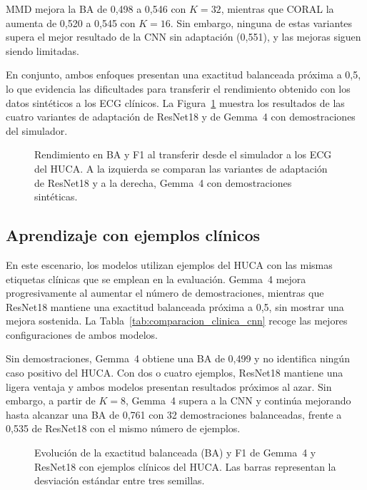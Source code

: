 MMD mejora la BA de 0,498 a 0,546 con \(K=32\), mientras que CORAL la aumenta de 0,520 a 0,545 con \(K=16\). Sin embargo, ninguna de estas variantes supera el mejor resultado de la CNN sin adaptación (0,551), y las mejoras siguen siendo limitadas.

En conjunto, ambos enfoques presentan una exactitud balanceada próxima a 0,5, lo que evidencia las dificultades para transferir el rendimiento obtenido con los datos sintéticos a los ECG clínicos. La Figura~\ref{fig:transfer_summary} muestra los resultados de las cuatro variantes de adaptación de ResNet18 y de Gemma~4 con demostraciones del simulador.

\begin{figure}[H]
  \centering
  \caption{Rendimiento en BA y F1 al transferir desde el simulador a los ECG del HUCA. A la izquierda se comparan las variantes de adaptación de ResNet18 y a la derecha, Gemma~4 con demostraciones sintéticas.}
  \label{fig:transfer_summary}
\end{figure}

\subsection{Aprendizaje con ejemplos clínicos}
\label{sec:resultados_clinicos}

En este escenario, los modelos utilizan ejemplos del HUCA con las mismas etiquetas clínicas que se emplean en la evaluación. Gemma~4 mejora progresivamente al aumentar el número de demostraciones, mientras que ResNet18 mantiene una exactitud balanceada próxima a 0,5, sin mostrar una mejora sostenida. La Tabla~\ref{tab:comparacion_clinica_cnn} recoge las mejores configuraciones de ambos modelos.


Sin demostraciones, Gemma~4 obtiene una BA de 0,499 y no identifica ningún caso positivo del HUCA. Con dos o cuatro ejemplos, ResNet18 mantiene una ligera ventaja y ambos modelos presentan resultados próximos al azar. Sin embargo, a partir de \(K=8\), Gemma~4 supera a la CNN y continúa mejorando hasta alcanzar una BA de 0,761 con 32 demostraciones balanceadas, frente a 0,535 de ResNet18 con el mismo número de ejemplos.

\begin{figure}[H]
  \centering
  \caption{Evolución de la exactitud balanceada (BA) y F1 de Gemma~4 y ResNet18 con ejemplos clínicos del HUCA. Las barras representan la desviación estándar entre tres semillas.}
  \label{fig:clinical_cnn_gemma_performance}
\end{figure}

